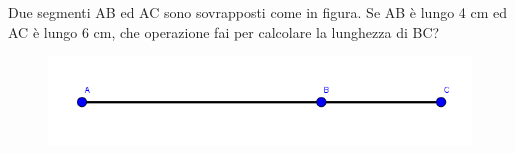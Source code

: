 \item Due segmenti AB ed AC sono sovrapposti come in figura. Se AB è lungo 4 cm ed AC è lungo 6 cm, che operazione fai per calcolare la lunghezza di BC?
\begin{figure}[h]
\centering
\includegraphics[width=13cm]{figure/somma_diff_segmenti.PNG}
\end{figure}

